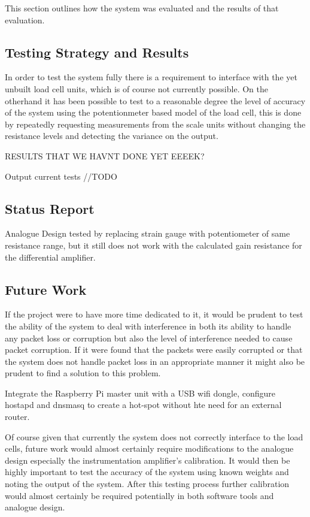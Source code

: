 This section outlines how the system was evaluated and the results of that evaluation.

\subsection{Testing Strategy and Results}

In order to test the system fully there is a requirement to interface with the yet unbuilt load cell units, which is of course not currently possible. On the otherhand it has been possible to test to a reasonable degree the level of accuracy of the system using the potentionmeter based model of the load cell, this is done by repeatedly requesting measurements from the scale units without changing the resistance levels and detecting the variance on the output. 

RESULTS THAT WE HAVNT DONE YET EEEEK?

Output current tests
//TODO


\subsection{Status Report}

Analogue Design tested by replacing strain gauge with potentiometer of same resistance range, but it still does not work with the calculated gain resistance for the differential amplifier.

\subsection{Future Work}

If the project were to have more time dedicated to it, it would be prudent to test the ability of the system to deal with interference in both its ability to handle any packet loss or corruption but also the level of interference needed to cause packet corruption. If it were found that the packets were easily corrupted or that the system does not handle packet loss in an appropriate manner it might also be prudent to find a solution to this problem.

Integrate the Raspberry Pi master unit with a USB wifi dongle, configure hostapd and dnsmasq to create a hot-spot without hte need for an external router.

Of course given that currently the system does not correctly interface to the load cells, future work would almost certainly require modifications to the analogue design especially the instrumentation amplifier's calibration. It would then be highly important to test the accuracy of the system using known weights and noting the output of the system. After this testing process further calibration would almost certainly be required potentially in both software tools and analogue design. 

